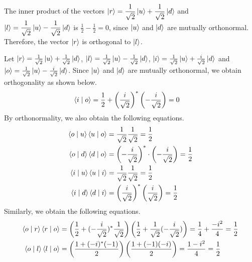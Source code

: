 \begin{answer}
	The inner product of the vectors $\displaystyle \ket{r} = \frac{1}{\sqrt{2}} \ket{u} + \frac{1}{\sqrt{2}} \ket{d}$ and $\displaystyle \ket{l} = \frac{1}{\sqrt{2}} \ket{u} - \frac{1}{\sqrt{2}} \ket{d}$ is $\frac{1}{2} - \frac{1}{2} = 0$, since $\ket{u}$ and $\ket{d}$ are mutually orthonormal.
	Therefore, the vector $\ket{r}$ is orthogonal to $\ket{l}$.
\end{answer}

\begin{answer}
	Let $\ket{r} = \frac{1}{\sqrt{2}} \ket{u} + \frac{1}{\sqrt{2}} \ket{d}$, $\ket{l} = \frac{1}{\sqrt{2}} \ket{u} - \frac{1}{\sqrt{2}} \ket{d}$, $\ket{i} = \frac{1}{\sqrt{2}} \ket{u} + \frac{i}{\sqrt{2}} \ket{d}$ and $\ket{o} = \frac{1}{\sqrt{2}} \ket{u} - \frac{i}{\sqrt{2}} \ket{d}$.
	Since $\ket{u}$ and $\ket{d}$ are mutually orthonormal, we obtain orthogonality as shown below.
	\begin{align*}
		\braket{i \mid o} & = \frac{1}{2} + \left(\frac{i}{\sqrt{2}}\right)^* \left(-\frac{i}{\sqrt{2}}\right) = 0
	\end{align*}
	By orthonormality, we also obtain the following equations.
	\begin{align*}
		\braket{o \mid u} \braket{u \mid o} & = \frac{1}{\sqrt{2}} \frac{1}{\sqrt{2}} = \frac{1}{2}                                     \\
		\braket{o \mid d} \braket{d \mid o} & = \left(-\frac{i}{\sqrt{2}}\right)^* \cdot \left(-\frac{i}{\sqrt{2}}\right) = \frac{1}{2} \\
		\braket{i \mid u} \braket{u \mid i} & = \frac{1}{\sqrt{2}} \frac{1}{\sqrt{2}} = \frac{1}{2}                                     \\
		\braket{i \mid d} \braket{d \mid i} & = \left(\frac{i}{\sqrt{2}}\right)^* \left(\frac{i}{\sqrt{2}}\right) = \frac{1}{2}
	\end{align*}
	Similarly, we obtain the following equations.
	\begin{align*}
		\braket{o \mid r} \braket{r \mid o} & = \left(\frac{1}{2} + (-\frac{i}{\sqrt{2}})^* \frac{1}{\sqrt{2}}\right)\left(\frac{1}{2} + \frac{1}{\sqrt{2}}(-\frac{i}{\sqrt{2}}) \right) = \frac{1}{4} + \frac{-i^2}{4} = \frac{1}{2} \\
		\braket{o \mid l} \braket{l \mid o} & = \left(\frac{1 + (-i)^*(-1)}{2}\right)\left(\frac{1 + (-1)(-i)}{2}\right) = \frac{1-i^2}{4} = \frac{1}{2}                                                                              \\

\end{align*}
\end{answer}
